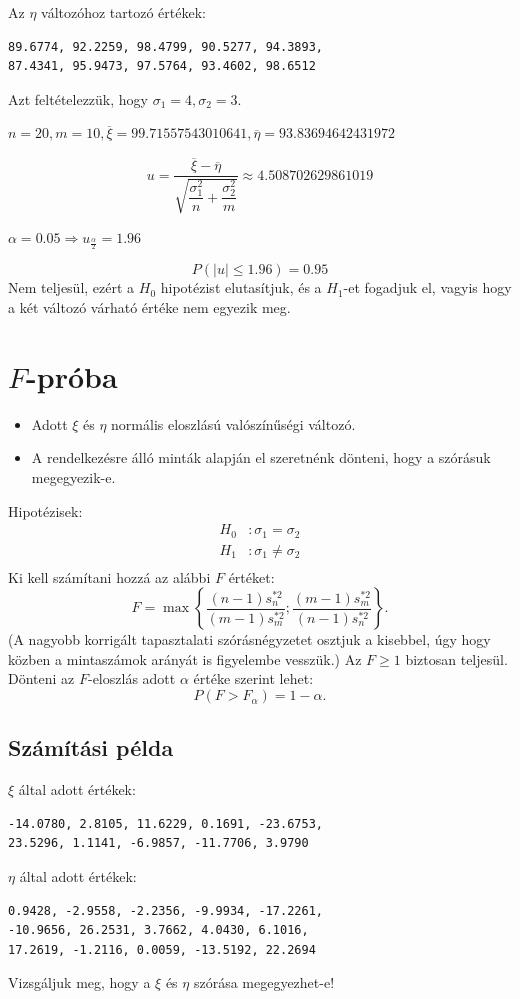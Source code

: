 \documentclass[a4paper]{article}
\begin{document}
Az $\eta$ változóhoz tartozó értékek:
\begin{verbatim}
89.6774, 92.2259, 98.4799, 90.5277, 94.3893,
87.4341, 95.9473, 97.5764, 93.4602, 98.6512
\end{verbatim}

Azt feltételezzük, hogy $\sigma_1 = 4, \sigma_2 = 3$.

\bigskip

$n = 20, m = 10, \overline{\xi} = 99.71557543010641, \overline{\eta} = 93.83694642431972$

\[
u = \dfrac{\overline{\xi} - \overline{\eta}}
{\sqrt{\dfrac{\sigma_1^2}{n} + \dfrac{\sigma_2^2}{m}}} \approx
4.508702629861019
\]

$\alpha = 0.05 \Rightarrow u_{\frac{\alpha}{2}} = 1.96$

\[
P(|u| \leq 1.96) = 0.95
\]
Nem teljesül, ezért a $H_0$ hipotézist elutasítjuk, és a $H_1$-et fogadjuk el, vagyis hogy a két változó várható értéke nem egyezik meg.

\section{$F$-próba}

\begin{itemize}
\item Adott $\xi$ és $\eta$ normális eloszlású valószínűségi változó.
\item A rendelkezésre álló minták alapján el szeretnénk dönteni, hogy a szórásuk megegyezik-e.
\end{itemize}
Hipotézisek:
\begin{align*}
H_0 &: \sigma_1 = \sigma_2 \\
H_1 &: \sigma_1 \neq \sigma_2 \\
\end{align*}
Ki kell számítani hozzá az alábbi $F$ értéket:
\[
F = \max\left\{
\dfrac{(n-1)s_n^{*2}}{(m-1)s_m^{*2}};
\dfrac{(m-1)s_m^{*2}}{(n-1)s_n^{*2}}
\right\}.
\]
(A nagyobb korrigált tapasztalati szórásnégyzetet osztjuk a kisebbel, úgy hogy közben a mintaszámok arányát is figyelembe vesszük.)
Az $F \geq 1$ biztosan teljesül.
Dönteni az $F$-eloszlás adott $\alpha$ értéke szerint lehet:
\[
P(F > F_{\alpha}) = 1 - \alpha.
\]

\subsection{Számítási példa}

$\xi$ által adott értékek:
\begin{verbatim}
-14.0780, 2.8105, 11.6229, 0.1691, -23.6753,
23.5296, 1.1141, -6.9857, -11.7706, 3.9790
\end{verbatim}
$\eta$ által adott értékek:
\begin{verbatim}
0.9428, -2.9558, -2.2356, -9.9934, -17.2261,
-10.9656, 26.2531, 3.7662, 4.0430, 6.1016,
17.2619, -1.2116, 0.0059, -13.5192, 22.2694
\end{verbatim}
Vizsgáljuk meg, hogy a $\xi$ és $\eta$ szórása megegyezhet-e!
\end{document}
